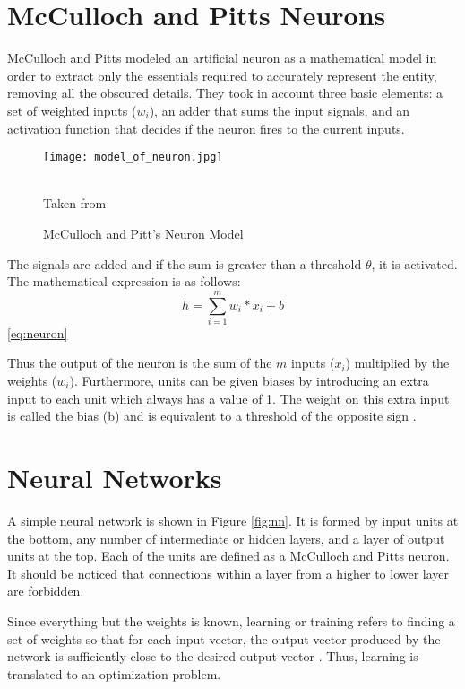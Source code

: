 \section{McCulloch and Pitts Neurons}
McCulloch and Pitts modeled an artificial neuron as a mathematical model in order to extract only the essentials required to accurately represent the entity, removing all the obscured details. They took in account three basic elements: a set of weighted inputs ($w_i$), an adder that sums the input signals, and an activation function that decides if the neuron fires to the current inputs.
\begin{figure}[h]
\centering
 
\texttt{[image: model\_of\_neuron.jpg]}
\caption{McCulloch and Pitt's Neuron Model}
\label{fig:neuron}
\begin{minipage}{12cm}
    \footnotesize
    \center
    \emph \\ Taken from \cite{marsland2015machine}
    \end{minipage}
\end{figure}

The signals are added and if the sum is greater than a threshold $\theta$, it is activated. The mathematical expression is as follows:\\
\begin{equation} \label{eq:neuron}
h=\sum_{i=1}^{m} w_i * x_i + b
\end{equation}\ref{eq:neuron}

Thus the output of the neuron is the sum of the $m$ inputs ($x_i$) multiplied by the weights ($w_i$). Furthermore, units can be given biases by introducing an extra input to each unit which always has a value of 1. The weight on this extra input is called the bias (b) and is equivalent to a threshold of the opposite sign \cite{polk2002cognitive}. 


\section{Neural Networks}

A simple neural network is shown in Figure \ref{fig:nn}. It is formed by input units at the bottom, any number of intermediate or hidden layers, and a layer of output units at the top. Each of the units are  defined as a McCulloch and Pitts neuron. It should be noticed that connections within a layer from a higher to lower layer are forbidden. 

Since everything but the weights is known, learning or training refers to finding a set of weights so that for each input vector, the output vector produced by the network is sufficiently close to the desired output vector \cite{polk2002cognitive}. Thus, learning is translated to an optimization problem.

